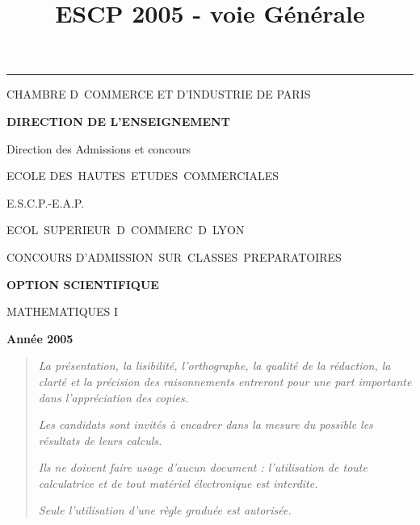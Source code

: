 \documentclass[11pt]{article}%
\title{\bf \vspace{-2cm} ESCP 2005 - voie Générale} %
\author{} %
\date{} %
\begin{document}
\maketitle %
\vspace{-1.4cm}\hrule %
\thispagestyle{fancy}

\vspace*{.2cm}




\begin{center}
{\small CHAMBRE D\E\ COMMERCE ET D'INDUSTRIE DE PARIS}

\textbf{DIRECTION DE L'ENSEIGNEMENT}

Direction des Admissions et concours

\underline{\hspace*{3cm}}

{\Large ECOLE DES\ HAUTES\ ETUDES\ COMMERCIALES}

{\Large E.S.C.P.-E.A.P.}

{\Large ECOL\E\ SUPERIEUR\E\ D\E\ COMMERC\E\ D\E\ LYON}{\large }

CONCOURS D'ADMISSION\ SUR\ CLASSES\ PREPARATOIRES

\underline{\hspace*{3cm}}

\textbf{OPTION SCIENTIFIQUE}

{\Large MATHEMATIQUES I}

\textbf{Année 2005}

\underline{\hspace*{3cm}}
\end{center}

\begin{quotation}
\noindent \textsl{La présentation, la lisibilité, l'orthographe, la
qualité
de la rédaction, la clarté et la précision des raisonnements entreront
pour
une part importante dans l'appréciation des copies.}

\noindent \textsl{Les candidats sont invités à encadrer dans la mesure
du
possible les résultats de leurs calculs.}

\noindent \textsl{Ils ne doivent faire usage d'aucun document :
l'utilisation de toute calculatrice et de tout matériel électronique
est
interdite.}

\noindent \textsl{Seule l'utilisation d'une règle graduée est
autorisée.}

\noindent \textsl{\hrulefill }
\end{quotation}
\end{document}
